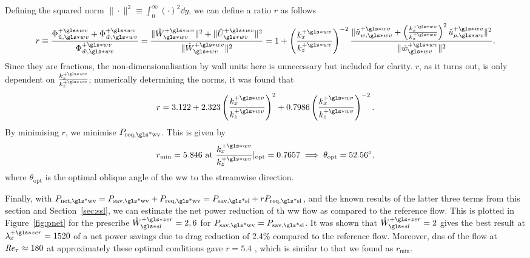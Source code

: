 Defining the squared norm $\|\cdot\|^2\equiv \int_{0}^{\infty} \left( \cdot \right) ^{2} \dd{y}  $, we can define a ratio $r$ as follows
\begin{equation}
	r\equiv\frac{\Phi _{\tilde{u},\gls*{wv}}\pw+\Phi _{\tilde{w},\gls*{wv}}\pw}{\Phi _{\tilde{w},\gls*{wv}}\pw}=\frac{\|\hat{W}\pw\ww\|^2+\|\hat{U}\pw\ww\|^2}{\|\hat{W}\pw\ww\|^2}=1+\left( \frac{k_x\pw}{k_z\pw} \right) ^{-2} \frac{\|\check{u}_{w,\gls*{wv}}\pw+\left( \frac{k_x\pw}{k_z\pw} \right) ^2 \check{u}_{p,\gls*{wv}}\pw\|^2}{\|\check{w}\ww\pw\|^2}
.\end{equation}
Since they are fractions, the non-dimensionalisation by wall units here is unnecessary but included for clarity. $r$, as it turns out, is only dependent on $\frac{k_x\pw}{k_z\pw}$; numerically determining the norms, it was found that
\begin{equation}
	r=3.122+2.323 \left( \frac{k_x\pw}{k_z\pw} \right) ^2+0.7986 \left( \frac{k_x\pw}{k_z\pw} \right) ^{-2} 
.\end{equation}
By minimising $r$, we minimise $P_\text{req,\gls*{wv}} $. This is given by
\begin{equation}
	r_\text{min} =5.846 \text{ at } \frac{k_x\pw}{k_z\pw}\rvert_\text{opt} = 0.7657 \implies \theta_\text{opt} = \ang{52.56}
,\end{equation}
where $\theta_\text{opt} $ is the optimal oblique angle of the \gls{ww} to the streamwise direction.

Finally, with $P_\text{net,\gls*{wv}} = P_\text{sav,\gls*{wv}} +P_\text{req,\gls*{wv}} =P_\text{sav,\gls*{sl}} +rP_\text{req,\gls*{sl}} $, and the known results of the latter three terms from this section and Section~\ref{sec:ssl}, we can estimate the net power reduction of th \gls{ww} flow as compared to the reference flow. This is plotted in Figure~\ref{fig:pnet} for the prescribe $\hat{W}\pz\ssl=2,6$ for $ P_\text{sav,\gls*{wv}}=P_\text{sav,\gls*{sl}} $. It was shown that $\hat{W}\pz\ssl=2$ gives the best result at $\lambda_x\pz=1520$ of a net power savings due to drag reduction of 2.4\% compared to the reference flow. Moreover, \gls{dns} of the flow at $\mbox{\textit{Re}}_{\tau}\approx180$ at approximately these optimal conditions gave $r=5.4$ \cite{ghebali2018}, which is similar to that we found as $r_\text{min} $.


